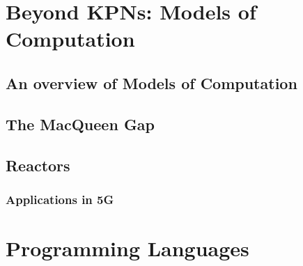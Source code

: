 \documentclass[
		twoside,openright,titlepage,numbers=noenddot,headinclude,%
	 	footinclude=true,cleardoublepage=empty,
		dottedtoc, %
		BCOR=5mm,paper=a4,fontsize=10pt, %
		ngerman,american, %
		]{scrreprt}
\begin{document}
%
%
%


%

\chapter{Beyond \acsp{KPN}: Models of Computation}
\label{chap:mocs}

\section{An overview of Models of Computation}
\label{sec:mocs_overview}

\section{The MacQueen Gap} %
\label{sec:macqueen}
\section{Reactors}
\label{sec:reactors}
\subsection{Applications in 5G}
\label{sec:5g}

\chapter{Programming Languages}
\label{chap:pl}

\end{document}
